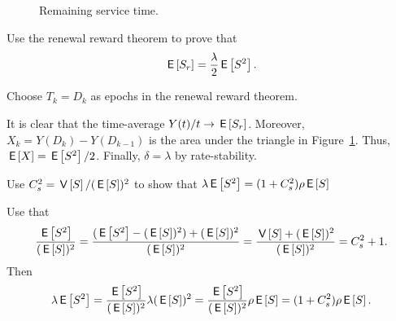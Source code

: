 \begin{figure}[htb]
  \centering
{}

  \caption{Remaining service time.}
  \label{fig:mg1remainingservicetime}
\end{figure}

\begin{exercise}[\faCalculator]
Use the renewal reward theorem to prove that 
\begin{equation}\label{eq:34}
\,\mathsf{E}\left[S_r\right] = \frac{\lambda}2 \,\mathsf{E}\left[S^2\right].
\end{equation}
\begin{hint}
  Choose $T_k=D_k$ as epochs in the renewal reward theorem.
\end{hint}
\begin{solution}
  It is clear that the time-average $Y(t)/t \to \,\mathsf{E}\left[S_r\right]$. Moreover, $X_k = Y(D_k) - Y(D_{k-1})$ is the area under the triangle in Figure~\ref{fig:mg1remainingservicetime}. Thus, $\,\mathsf{E}\left[X\right] = \,\mathsf{E}\left[S^2\right]/2$. Finally,  $\delta = \lambda$ by rate-stability.
\end{solution}
\end{exercise}

\begin{exercise}[\faCalculator]
Use $C_s^2 = \,\mathsf{V}\left[S\right] / (\,\mathsf{E}\left[S\right])^2$ to show that $\lambda \,\mathsf{E}\left[S^2\right] = (1+C_s^2)\rho\,\mathsf{E}\left[S\right]$
\begin{solution}
Use that 
\begin{equation*}
  \frac{\,\mathsf{E}\left[S^2\right]}{(\,\mathsf{E}\left[S\right])^2} = 
  \frac{(\,\mathsf{E}\left[S^2\right]-(\,\mathsf{E}\left[S\right])^2) + (\,\mathsf{E}\left[S\right])^2}{(\,\mathsf{E}\left[S\right])^2} =
  \frac{\,\mathsf{V}\left[S\right] + (\,\mathsf{E}\left[S\right])^2}{(\,\mathsf{E}\left[S\right])^2} =
  C_s^2 + 1.
\end{equation*}
Then
\begin{equation*}
  \lambda\,\mathsf{E}\left[S^2\right] = \frac{\,\mathsf{E}\left[S^2\right]}{(\,\mathsf{E}\left[S\right])^2} \lambda(\,\mathsf{E}\left[S\right])^2=
 \frac{\,\mathsf{E}\left[S^2\right]}{(\,\mathsf{E}\left[S\right])^2} \rho \,\mathsf{E}\left[S\right] = (1+C_s^2) \rho \,\mathsf{E}\left[S\right].
\end{equation*}
\end{solution}
\end{exercise}


